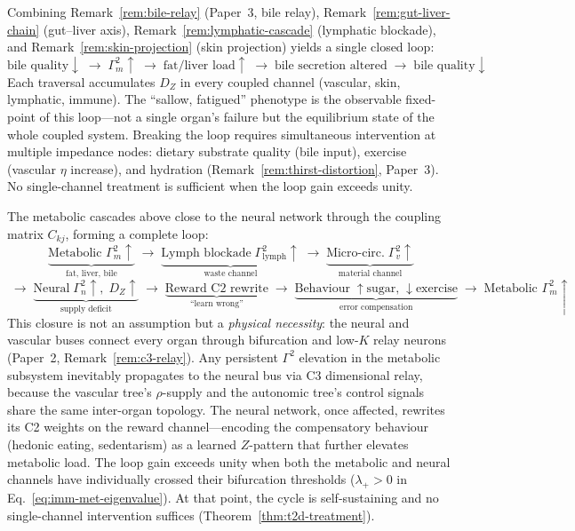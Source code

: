 \documentclass[aps,pre,twocolumn,superscriptaddress,floatfix]{revtex4-2}
\begin{document}
\begin{remark}
\label{rem:metabolic-loop}
Combining
Remark~\ref{rem:bile-relay} (Paper~3, bile relay),
Remark~\ref{rem:gut-liver-chain} (gut--liver axis),
Remark~\ref{rem:lymphatic-cascade}
(lymphatic blockade),
and Remark~\ref{rem:skin-projection}
(skin projection) yields a single closed loop:
\[
  \text{bile quality}\!\downarrow
  \;\to\;
  \Gamma_m^2\!\uparrow
  \;\to\;
  \text{fat/liver load}\!\uparrow
  \;\to\;
  \text{bile secretion altered}
  \;\to\;
  \text{bile quality}\!\downarrow
\]
Each traversal accumulates $D_Z$ in every
coupled channel (vascular, skin, lymphatic, immune).
The ``sallow, fatigued'' phenotype is the
observable fixed-point of this loop---not a single
organ's failure but the equilibrium state of the
whole coupled system.
Breaking the loop requires simultaneous
intervention at multiple impedance nodes:
dietary substrate quality (bile input),
exercise (vascular $\eta$ increase),
and hydration (Remark~\ref{rem:thirst-distortion},
Paper~3).
No single-channel treatment is sufficient when
the loop gain exceeds unity.
\end{remark}

\begin{remark}
\label{rem:met-neural-closure}
The metabolic cascades above close to the neural
network through the coupling matrix $C_{kj}$,
forming a complete loop:
\[
  \underbrace{\text{Metabolic }\Gamma_m^2\!\uparrow}
    _{\text{fat, liver, bile}}
  \;\to\;
  \underbrace{\text{Lymph blockade}\;
    \Gamma_{\text{lymph}}^2\!\uparrow}
    _{\text{waste channel}}
  \;\to\;
  \underbrace{\text{Micro-circ.}\;
    \Gamma_v^2\!\uparrow}
    _{\text{material channel}}
\]
\[
  \;\to\;
  \underbrace{\text{Neural}\;
    \Gamma_n^2\!\uparrow,\;D_Z\!\uparrow}
    _{\text{supply deficit}}
  \;\to\;
  \underbrace{\text{Reward C2 rewrite}}
    _{\text{``learn wrong''}}
  \;\to\;
  \underbrace{\text{Behaviour}\;\uparrow\text{sugar,}
    \;\downarrow\text{exercise}}
    _{\text{error compensation}}
  \;\to\;
  \text{Metabolic }\Gamma_m^2\!\uparrow
\]
This closure is not an assumption but a \emph{physical
necessity}: the neural and vascular buses connect every
organ through bifurcation and low-$K$ relay neurons
(Paper~2, Remark~\ref{rem:c3-relay}).
Any persistent $\Gamma^2$ elevation in the metabolic
subsystem inevitably propagates to the neural bus
via C3 dimensional relay, because the vascular tree's
$\rho$-supply and the autonomic tree's control signals
share the same inter-organ topology.
The neural network, once affected, rewrites its C2
weights on the reward channel---encoding the
compensatory behaviour (hedonic eating, sedentarism)
as a learned $Z$-pattern that further elevates
metabolic load.
The loop gain exceeds unity when both the metabolic
and neural channels have individually crossed their
bifurcation thresholds ($\lambda_+ > 0$ in
Eq.~\ref{eq:imm-met-eigenvalue}).
At that point, the cycle is self-sustaining and
no single-channel intervention suffices
(Theorem~\ref{thm:t2d-treatment}).
\end{remark}
\end{document}
